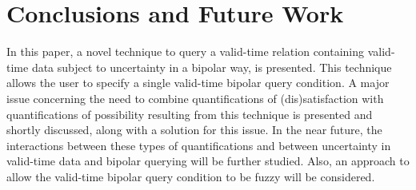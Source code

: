 \documentclass[runningheads,a4paper]{llncs}
\begin{document}
\section{Conclusions and Future Work\label{sec:conclusions}}
In this paper, a novel technique to query a valid-time relation containing valid-time data subject to uncertainty in a bipolar way, is presented. This technique allows the user to specify a single valid-time bipolar query condition. A major issue concerning the need to combine quantifications of (dis)satisfaction with quantifications of possibility resulting from this technique is presented and shortly discussed, along with a solution for this issue. In the near future, the interactions between these types of quantifications and between uncertainty in valid-time data and bipolar querying will be further studied. Also, an approach to allow the valid-time bipolar query condition to be fuzzy will be considered.



\end{document}
